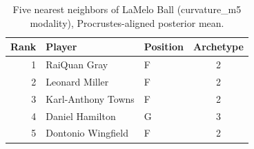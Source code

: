 \begin{table}[htbp]
  \centering\small
  \begin{tabular}{rllc}
    \toprule
    Rank & Player & Position & Archetype \\
    \midrule
    1 & RaiQuan Gray & F & 2 \\
    2 & Leonard Miller & F & 2 \\
    3 & Karl-Anthony Towns & F & 2 \\
    4 & Daniel Hamilton & G & 3 \\
    5 & Dontonio Wingfield & F & 2 \\
    \bottomrule
  \end{tabular}
  \caption{Five nearest neighbors of LaMelo Ball (curvature_m5 modality), Procrustes-aligned posterior mean.}
  \label{tab:LaMelo_Ball_neighbors_curvature_m5}
\end{table}


